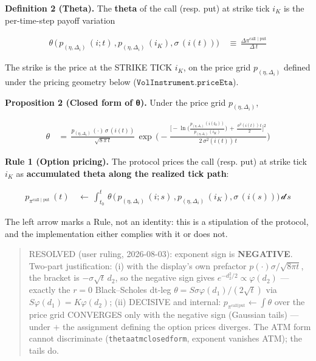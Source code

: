 \documentclass[11pt]{article}
\renewcommand{\_}{\textunderscore\allowbreak}
\begin{document}
\textbf{Definition 2 (Theta).} The \textbf{theta} of the call (resp. put) at strike tick \(i_K\) is the per-time-step payoff variation

\[
    \begin{aligned}
        \theta \, \Big (\, p_{(\eta, \Delta_i)} \, (i; t) \, , p_{(\eta, \Delta_i)} \, (i_K),  \sigma \, (i (t)) \Big ) \, &\equiv \, \frac{\Delta \pi^{\text{call | put}}}{\Delta\, t }
    \end{aligned}
\]

The strike is the price at the STRIKE TICK \(i_K\), on the price grid \(p_{(\eta, \Delta_i)}\) defined under the pricing geometry below (\(\texttt{VolInstrument.priceEta}\)).

\textbf{Proposition 2 (Closed form of θ).} Under the price grid \(p_{(\eta,\Delta_i)}\),

\[
    \begin{aligned}
        \theta \, &= \,  \frac{p_{(\eta, \Delta_i)} \, (\cdot)\, \sigma \, (i(t))}{\sqrt{8\, \pi \, t}} \, \exp \, \Big (-\frac{\Big [- \ln \Big(\frac{p_{(\eta, \Delta_i)} \, (i (t_0))}{p_{(\eta, \Delta_i)} \, (i_K)}\Big) \, + \, \frac{\sigma^2(i(t)) \, t}{2} \Big ]^2}{2\, \sigma^2(i(t))\, t}\Big)
    \end{aligned}
\]

\textbf{Rule 1 (Option pricing).} The protocol prices the call (resp. put) at strike tick \(i_K\) as \textbf{accumulated theta along the realized tick path}:

\[
    \begin{aligned}
        p_{\pi^{\text{call | put}}}\, (t) \, &\leftarrow \, \int_{t_0}^{t} \, \theta \, \Big (\, p_{(\eta, \Delta_i)} \, (i; s) \, , p_{(\eta, \Delta_i)} \, (i_K),  \sigma \, (i (s)) \Big ) \, \mathcal{d}\, s
    \end{aligned}
\]

The left arrow marks a Rule, not an identity: this is a stipulation of the protocol, and the implementation either complies with it or does not.

\begin{quote}
RESOLVED (user ruling, 2026-08-03): exponent sign is \textbf{NEGATIVE}. Two-part justification: (i) with the display's own prefactor \(p(\cdot)\sigma/\sqrt{8\pi t}\), the bracket is \(-\sigma\sqrt{t}\,d_2\), so the negative sign gives \(e^{-d_2^2/2} \propto \varphi(d_2)\) --- exactly the \(r=0\) Black--Scholes dt-leg \(\theta = S\sigma\varphi(d_1)/(2\sqrt t)\) via \(S\varphi(d_1)=K\varphi(d_2)\); (ii) DECISIVE and internal: \(p_{\pi^{\text{call|put}}} \leftarrow \int\theta\) over the price grid CONVERGES only with the negative sign (Gaussian tails) --- under \(+\) the assignment defining the option prices diverges. The ATM form cannot discriminate (\texttt{theta\_atm\_closed\_form}, exponent vanishes ATM); the tails do.
\end{quote}
\end{document}
